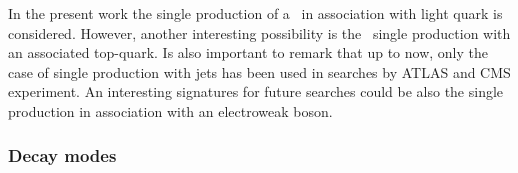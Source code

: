 In the present work the single production of a \Tp~in association with light quark is considered. However, another interesting possibility is the \Tp~single production with an associated top-quark. Is also important to remark that up to now, only the case of single production with jets has been used in searches by ATLAS and CMS experiment. An interesting signatures for future searches could be also the single production in association with an electroweak boson.

\begin{table}[htbH]
\begin{center}
\caption{\Tp~production cross sections in single and pair production modes, for proton-proton collisions at 8 TeV center of mass energy. The cross sections have been calculated for the non-standard doublet with maximized couplings to light generations. \label{tab:TheoXS}}
\end{center}
\end{table}

\subsubsection{Decay modes}
\label{sec:decay}

